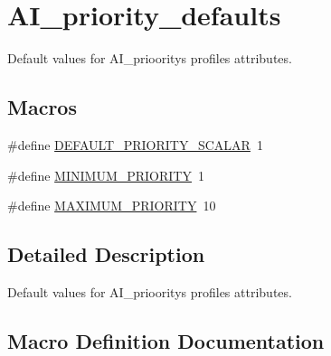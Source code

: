 \hypertarget{group__AI__priority__defaults}{}\section{A\+I\+\_\+priority\+\_\+defaults}
\label{group__AI__priority__defaults}


Default values for A\+I\+\_\+prioority\textquotesingle{}s profile\textquotesingle{}s attributes.  


\subsection*{Macros}
\begin{DoxyCompactItemize}
\item 
\#define \hyperlink{group__AI__priority__defaults_ga4e3908ed63849f3f9aee6934d85eb6fc}{D\+E\+F\+A\+U\+L\+T\+\_\+\+P\+R\+I\+O\+R\+I\+T\+Y\+\_\+\+S\+C\+A\+L\+AR}~1
\item 
\#define \hyperlink{group__AI__priority__defaults_ga10f85a3cc00c157b5358823672961588}{M\+I\+N\+I\+M\+U\+M\+\_\+\+P\+R\+I\+O\+R\+I\+TY}~1
\item 
\#define \hyperlink{group__AI__priority__defaults_ga846a6e194ab29d2ab24677384de604d0}{M\+A\+X\+I\+M\+U\+M\+\_\+\+P\+R\+I\+O\+R\+I\+TY}~10
\end{DoxyCompactItemize}


\subsection{Detailed Description}
Default values for A\+I\+\_\+prioority\textquotesingle{}s profile\textquotesingle{}s attributes. 



\subsection{Macro Definition Documentation}
\mbox{\label{group__AI__priority__defaults_ga4e3908ed63849f3f9aee6934d85eb6fc}} 
